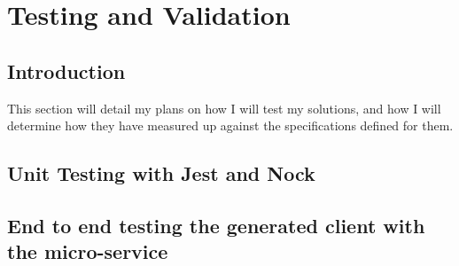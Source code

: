 \chapter{Testing and Validation}
\section{Introduction}
This section will detail my plans on how I will test my solutions, and how I will determine how they have measured up against the specifications defined for them.
\section{Unit Testing with Jest and Nock}
\section{End to end testing the generated client with the micro-service}
